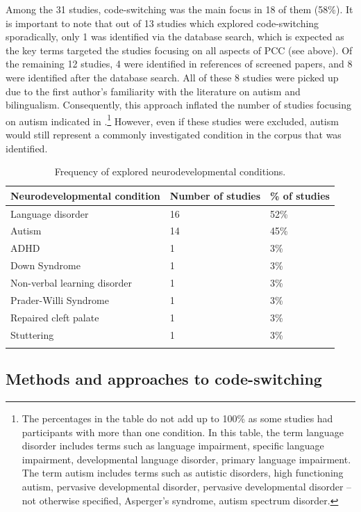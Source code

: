 \documentclass[output=paper]{langscibook}
\begin{document}
Among the 31 studies, code-switching was the main focus in 18 of them (58\%). It is important to note that out of 13 studies which explored code-switching sporadically, only 1 was identified via the database search, which is expected as the key terms targeted the studies focusing on all aspects of PCC (see  above). Of the remaining 12 studies, 4 were identified in references of screened papers, and 8 were identified after the database search. All of these 8 studies were picked up due to the first author’s familiarity with the literature on autism and bilingualism. Consequently, this approach inflated the number of studies focusing on autism indicated in .\footnote{The percentages in the table do not add up to 100\% as some studies had participants with more than one condition. In this table, the term language disorder includes terms such as language impairment, specific language impairment, developmental language disorder, primary language impairment. The term autism includes terms such as autistic disorders, high functioning autism, pervasive developmental disorder, pervasive developmental disorder – not otherwise specified, Asperger’s syndrome, autism spectrum disorder.} However, even if these studies were excluded, autism would still represent a commonly investigated condition in the corpus that was identified.

\begin{table}
\begin{tabularx}{\textwidth}{lYY}
\lsptoprule
Neurodevelopmental condition & Number of studies & \% of studies\\
\midrule
Language disorder             & 16&52\%\\
Autism                        & 14&45\%\\
ADHD                          & 1 & 3\%\\
Down Syndrome                 & 1 & 3\%\\
Non-verbal learning disorder  & 1 & 3\%\\
Prader-Willi Syndrome         & 1 & 3\%\\
Repaired cleft palate         & 1 & 3\%\\
Stuttering                    & 1 & 3\%\\
\lspbottomrule
\end{tabularx}
\caption{Frequency of explored neurodevelopmental conditions.} 
\label{tab:kascelan:2}
\end{table}

\subsection{Methods and approaches to code-switching}
\end{document}
